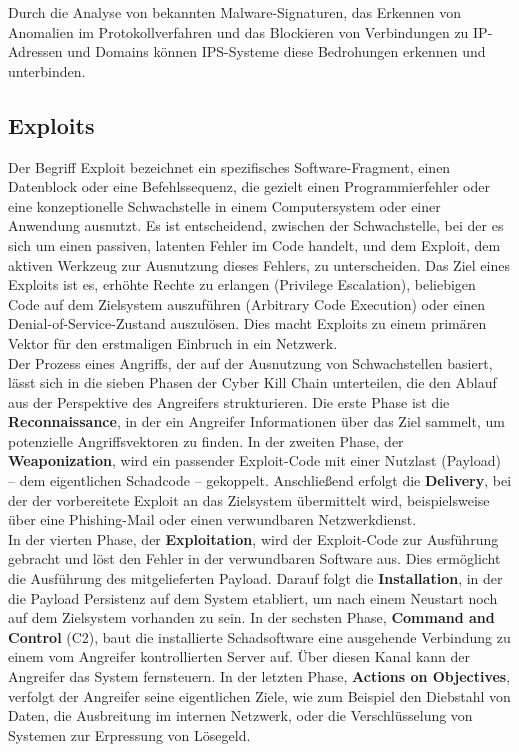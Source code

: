 Durch die Analyse von bekannten Malware-Signaturen, das Erkennen von Anomalien im Protokollverfahren und das Blockieren von Verbindungen zu IP-Adressen und Domains können IPS-Systeme diese Bedrohungen erkennen und unterbinden.



\subsection{Exploits}
Der Begriff Exploit bezeichnet ein spezifisches Software-Fragment, einen Datenblock oder eine Befehlssequenz, die gezielt einen Programmierfehler oder eine konzeptionelle Schwachstelle in einem Computersystem oder einer Anwendung ausnutzt. Es ist entscheidend, zwischen der Schwachstelle, bei der es sich um einen passiven, latenten Fehler im Code handelt, und dem Exploit, dem aktiven Werkzeug zur Ausnutzung dieses Fehlers, zu unterscheiden. Das Ziel eines Exploits ist es, erhöhte Rechte zu erlangen (Privilege Escalation), beliebigen Code auf dem Zielsystem auszuführen (Arbitrary Code Execution) oder einen Denial-of-Service-Zustand auszulösen. Dies macht Exploits zu einem primären Vektor für den erstmaligen Einbruch in ein Netzwerk.\cite{wik12}\\

Der Prozess eines Angriffs, der auf der Ausnutzung von Schwachstellen basiert, lässt sich in die sieben Phasen der Cyber Kill Chain unterteilen, die den Ablauf aus der Perspektive des Angreifers strukturieren. Die erste Phase ist die \textbf{Reconnaissance}, in der ein Angreifer Informationen über das Ziel sammelt, um potenzielle Angriffsvektoren zu finden. In der zweiten Phase, der \textbf{Weaponization}, wird ein passender Exploit-Code mit einer Nutzlast (Payload) – dem eigentlichen Schadcode – gekoppelt. Anschließend erfolgt die \textbf{Delivery}, bei der der vorbereitete Exploit an das Zielsystem übermittelt wird, beispielsweise über eine Phishing-Mail oder einen verwundbaren Netzwerkdienst.\\

In der vierten Phase, der \textbf{Exploitation}, wird der Exploit-Code zur Ausführung gebracht und löst den Fehler in der verwundbaren Software aus. Dies ermöglicht die Ausführung des mitgelieferten Payload. Darauf folgt die \textbf{Installation}, in der die Payload Persistenz auf dem System etabliert, um nach einem Neustart noch auf dem Zielsystem vorhanden zu sein. In der sechsten Phase, \textbf{Command and Control} (C2), baut die installierte Schadsoftware eine ausgehende Verbindung zu einem vom Angreifer kontrollierten Server auf. Über diesen Kanal kann der Angreifer das System fernsteuern. In der letzten Phase, \textbf{Actions on Objectives}, verfolgt der Angreifer seine eigentlichen Ziele, wie zum Beispiel den Diebstahl von Daten, die Ausbreitung im internen Netzwerk, oder die Verschlüsselung von Systemen zur Erpressung von Lösegeld.\cite{wik1}\\


